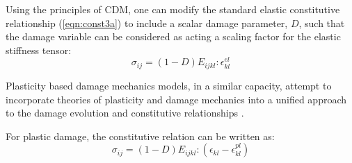 Using the principles of CDM, one can modify the standard elastic constitutive relationship (\ref{eqn:const3a}) to include a scalar damage parameter, $D$, such that the damage variable can be considered as acting a scaling factor for the elastic stiffness tensor: 
\begin{equation}
\sigma_{ij}=\left(1-D\right)E_{ijkl}:\epsilon_{kl}^{el}
\label{eqn:const3}
\end{equation}





Plasticity based damage mechanics models, in a similar capacity, attempt to incorporate theories of plasticity and damage mechanics into a unified approach to the damage evolution and constitutive relationships \cite{zhang_continuum_2010}. 

For plastic damage, the constitutive relation can be written as:
\begin{equation}
\sigma_{ij}=\left(1-D\right)E_{ijkl}:\left(\epsilon_{kl}-\epsilon^{pl}_{kl}\right)
\label{eqn:const5}
\end{equation}

